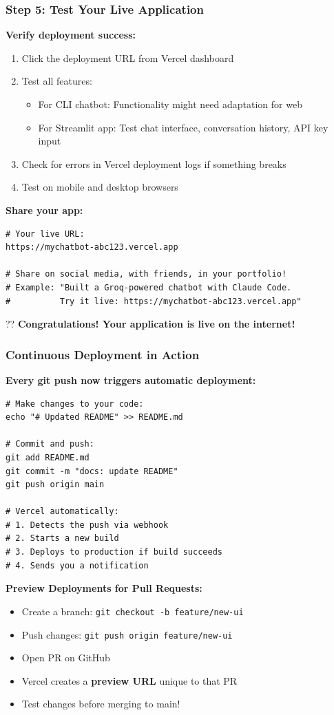 \begin{frame}[fragile]\frametitle{Step 5: Test Your Live Application}
\textbf{Verify deployment success:}

  \begin{enumerate}
    \item Click the deployment URL from Vercel dashboard
    \item Test all features:
      \begin{itemize}
        \item For CLI chatbot: Functionality might need adaptation for web
        \item For Streamlit app: Test chat interface, conversation history, API key input
      \end{itemize}
    \item Check for errors in Vercel deployment logs if something breaks
    \item Test on mobile and desktop browsers
  \end{enumerate}

\textbf{Share your app:}
\begin{lstlisting}
# Your live URL:
https://mychatbot-abc123.vercel.app

# Share on social media, with friends, in your portfolio!
# Example: "Built a Groq-powered chatbot with Claude Code.
#          Try it live: https://mychatbot-abc123.vercel.app"
\end{lstlisting}

?? \textbf{Congratulations! Your application is live on the internet!}
\end{frame}


\begin{frame}[fragile]\frametitle{Continuous Deployment in Action}
\textbf{Every git push now triggers automatic deployment:}

\begin{lstlisting}
# Make changes to your code:
echo "# Updated README" >> README.md

# Commit and push:
git add README.md
git commit -m "docs: update README"
git push origin main

# Vercel automatically:
# 1. Detects the push via webhook
# 2. Starts a new build
# 3. Deploys to production if build succeeds
# 4. Sends you a notification
\end{lstlisting}

\textbf{Preview Deployments for Pull Requests:}
  \begin{itemize}
    \item Create a branch: \lstinline|git checkout -b feature/new-ui|
    \item Push changes: \lstinline|git push origin feature/new-ui|
    \item Open PR on GitHub
    \item Vercel creates a \textbf{preview URL} unique to that PR
    \item Test changes before merging to main!
  \end{itemize}
\end{frame}


